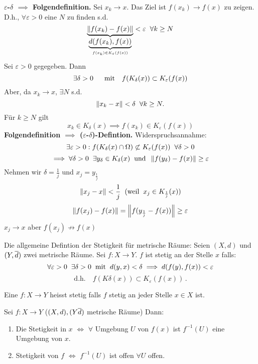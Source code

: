 \begin{Bew}
 {\bf $\varepsilon$-$\delta$ $\implies$ Folgendefinition.} Sei $x_k\to x$. Das Ziel ist $f(x_k)\to f(x)$ zu zeigen.
D.h., $\forall \varepsilon>0$ eine $N$ zu finden s.d.
  \[ \underbrace{\left\| f(x_k)-f(x) \right\|}_{\underbrace{d(f(x_k),f(x))}_{f(x_k)\in K_\varepsilon(f(x))}}<\varepsilon\hspace{2mm}\forall k\geq N\]
Sei $\varepsilon > 0$ gegegeben.  Dann
\[\exists \delta>0\hspace{2mm} \quad\mbox{mit}\quad f(K_\delta(x))\subset K_\varepsilon(f(x))\]
Aber, da $x_k\to x$, $\exists N$ s.d.
  \[\left\| x_k-x \right\|<\delta\hspace{2mm} \forall k\geq N.\]
F\"ur $k\geq N$ gilt
  \[x_k \in K_\delta(x)\implies f(x_k)\in K_\varepsilon(f(x))\]
{\bf Folgendefinition $\implies$ ($\varepsilon$-$\delta$)-Defintion.} Widerspruchsannahme: 
  \[\exists \varepsilon>0: f(K_\delta(x)\cap \Omega)\not\subset K_\varepsilon(f(x))\hspace{2mm}\forall \delta>0\]
  \[\implies\forall \delta>0\hspace{2mm}\exists y_\delta\in K_\delta(x)\hspace{2mm}\text{und}\hspace{2mm} \left\| f(y_\delta)-f(x) \right\|\geq \varepsilon\]
  Nehmen wir $\delta=\frac{1}{j}$ und $x_j=y_{\frac{1}{j}}$
  \[\left\| x_j-x \right\|<\frac{1}{j}\hspace{2mm}(\text{weil}\hspace{2mm} x_j\in K_{\frac{1}{j}}(x))\]
  \[\left\| f(x_j)-f(x) \right\|=\left\| f(y_{\frac{1}{j}}-f(x)) \right\|\geq\varepsilon\]
  $x_j\to x$ aber $f(x_j)\not\to f(x)$
\end{Bew}
\begin{Def}
  Die allgemeine Defintion der Stetigkeit für metrische Räume: Seien $(X,d)$ und $(Y,\overline{d})$ zwei metrische Räume. Sei $f:X\to Y$. $f$ ist stetig an der Stelle $x$ falls:
  \[\forall \varepsilon>0\hspace{2mm}\exists \delta>0\hspace{2mm}\text{mit}\hspace{2mm} d(y,x)<\delta\implies d(f(y),f(x))<\varepsilon\]
  \[\mbox{d.h.}\quad f(K\delta(x))\subset K_\varepsilon(f(x))\, .\]
\end{Def}
\begin{Def}
  Eine $f:X\to Y$ heisst stetig falls $f$ stetig an jeder Stelle $x\in X$ ist.
\end{Def}
\begin{Sat}
  Sei $f:X\to Y$ ($(X,d), (Y\overline{d})$ metrische Räume) Dann:
  \begin{enumerate}
    \item Die Stetigkeit in $x$ $\iff$ $\forall$ Umgebung $U$ von $f(x)$ ist $f^{-1}(U)$ eine Umgebung von $x$.
    \item Stetigkeit von $f$ $\iff$ $f^{-1}(U)$ ist offen $\forall U$ offen.
  \end{enumerate}
\end{Sat}
